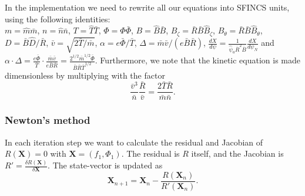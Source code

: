 \documentclass[12pt]{article}
\begin{document}
\noindent In the implementation we need to rewrite all our equations into SFINCS units, using the following identities:\\
$m = \hat{m} \bar{m}$, $n = \hat{n} \bar{n}$, $T = \hat{T} \bar{T}$, $\Phi = \hat{\Phi} \bar{\Phi}$, 
$B = \hat{B} \bar{B}$, $B_\zeta = \bar{R} \bar{B} \hat{B}_\zeta$, $B_\theta = \bar{R} \bar{B} \hat{B}_\theta$, $D = \bar{B} \hat{D} / \bar{R}$, 
$\bar{v} = \sqrt{2 \bar{T} / \bar{m}}$, $\alpha = e \bar{\Phi} / \bar{T}$,  $\Delta = \bar{m} \bar{v} / \left(e \bar{B} \bar{R} \right)$, $\displaystyle \frac{d X}{d \psi} = \frac{1}{\hat{\psi}_a \bar{R}^2 \bar{B}} \frac{d X}{d \psi_N}$
and 
$\displaystyle \alpha \cdot \Delta = \frac{e \bar{\Phi}}{\bar{T}} \cdot \frac{\bar{m} \bar{v}}{e \bar{B} \bar{R}} = \frac{2^{1/2} \bar{m}^{1/2} \bar{\Phi}}{\bar{B} \bar{R} \bar{T}^{1/2}}$. 
Furthermore, we note that the kinetic equation is made dimensionless by multiplying with the factor 
\begin{equation}
  \label{eq:DimensionlessFactor}
  \frac{\bar{v}^3}{\bar{n}} \frac{\bar{R}}{\bar{v}} = \frac{2 \bar{T} \bar{R}}{\bar{m} \bar{n}}.
\end{equation}

\subsubsection*{Newton's method}
In each iteration step we want to calculate the residual and Jacobian of $R\left(\bm{X}\right) = 0$ with $\bm{X} = \left(f_{1}, \Phi_1\right)$. 
The residual is $R$ itself, and the Jacobian is $\displaystyle R' = \frac{\delta R\left(\bm{X}\right)}{\delta \bm{X}}$. 
The state-vector is updated as
\begin{equation}
  \label{eq:StateVectorUpdate}
  \bm{X}_{n+1} = \bm{X}_{n} - \frac{R\left(\bm{X}_{n}\right)}{R'\left(\bm{X}_{n}\right)}.
\end{equation}

\newpage
\end{document}
